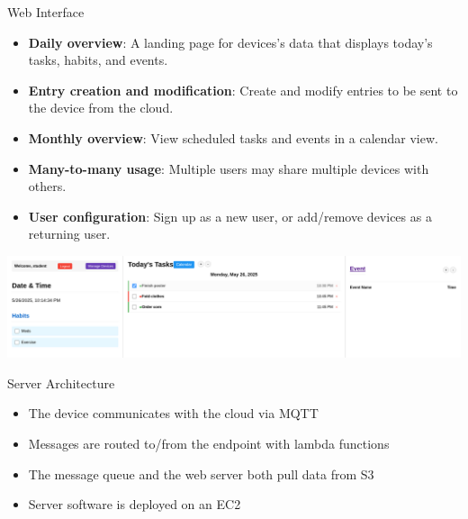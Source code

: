 \documentclass[final]{beamer}
\newlength{\colwidth}
\begin{document}
\begin{frame}[t]
\begin{columns}[t]
\begin{column}{\colwidth}
      \begin{block}{Web Interface}
        \begin{itemize}
          \item \textbf{Daily overview}: A landing page for devices's data 
            that displays today's tasks, habits, and events.
          \item \textbf{Entry creation and modification}: Create and modify 
            entries to be sent to the device from the cloud.
          \item \textbf{Monthly overview}: View scheduled tasks and events in a
            calendar view.
          \item \textbf{Many-to-many usage}: Multiple users may share multiple
            devices with others.
          \item \textbf{User configuration}: Sign up as a new user, or
            add/remove devices as a returning user.
        \end{itemize}
        \includegraphics[width = \textwidth]{web_mainview.png}
      \end{block}

      \begin{block}{Server Architecture}
        \begin{itemize}
          \item The device communicates with the cloud via MQTT
          \item Messages are routed to/from the endpoint with lambda functions
          \item The message queue and the web server both pull data from S3
          \item Server software is deployed on an EC2 
        \end{itemize}


\end{block}
\end{column}
\end{columns}
\end{frame}
\end{document}
